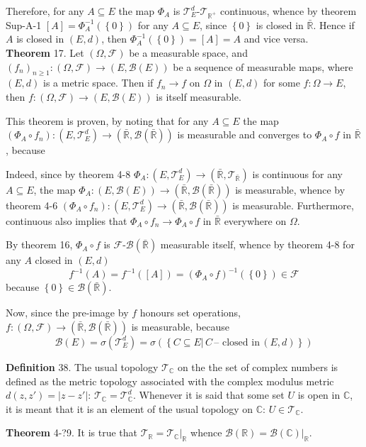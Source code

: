 \documentclass[a4paper]{article}
\newcommand{\obj}[1]{\left\{ #1 \right \}}
\newcommand{\clo}[1]{\left [ #1 \right ]}
\newcommand{\brac}[1]{\left ( #1 \right )}
\newcommand{\induc}[1]{\left . #1 \right \vert}
\newcommand{\abs}[1]{\left | #1 \right |}
\newcommand{\Rbar}{{\bar{\mathbb{R}}}}
\newcommand{\Real}{\mathbb{R}}
\newcommand{\Cplx}{\mathbb{C}}
\newcommand{\Tcal}{\mathcal{T}}
\newcommand{\Fcal}{\mathcal{F}}
\newcommand{\borel}[1]{\mathcal{B}\brac{#1}}
\begin{document}
Therefore, for any $A\subseteq E$ the map $\Phi_A$ is $\Tcal_E^d$-$\Tcal_{\Real^+}$ continuous, whence by theorem Sup-A-1 $\clo{A}=\Phi_A^{-1}\brac{\obj{0}}$ for any $A\subseteq E$, since $\obj{0}$ is closed in $\Rbar$. Hence if $A$ is closed in $\brac{E, d}$, then $\Phi_A^{-1}\brac{\obj{0}} = \clo{A} = A$ and vice versa.\\

\label{thm:metric_lim_meas} \noindent \textbf{Theorem} 17.
Let $\brac{\Omega, \Fcal}$ be a measurable space, and $\brac{f_n}_{n\geq 1}:\brac{\Omega, \Fcal}\to\brac{E, \borel{E}}$ be a sequence of measurable maps, where $\brac{E, d}$ is a metric space. Then if $f_n\to f$ on $\Omega$ in $\brac{E, d}$ for some $f:\Omega\to E$, then $f:\brac{\Omega, \Fcal}\to\brac{E, \borel{E}}$ is itself measurable.

This theorem is proven, by noting that for any $A\subseteq E$ the map $\brac{\Phi_A\circ f_n}:\brac{E, \Tcal_E^d}\to\brac{\Rbar, \borel{\Rbar}}$ is measurable and converges to $\Phi_A\circ f$ in $\Rbar$, because

Indeed, since by theorem 4-8 $\Phi_A:\brac{E, \Tcal_E^d}\to\brac{\Rbar, \Tcal_\Rbar}$ is continuous for any $A\subseteq E$, the map $\Phi_A:\brac{E, \borel{E}}\to\brac{\Rbar, \borel{\Rbar}}$ is measurable, whence by theorem 4-6 $\brac{\Phi_A\circ f_n}:\brac{E, \Tcal_E^d}\to\brac{\Rbar, \borel{\Rbar}}$ is measurable. Furthermore, continuous also implies that $\Phi_A\circ f_n\to \Phi_A\circ f$ in $\Rbar$ everywhere on $\Omega$.

By theorem 16, $\Phi_A\circ f$ is $\Fcal$-$\borel{\Rbar}$ measurable itself, whence by theorem 4-8 for any $A$ closed in $\brac{E,d}$ \[f^{-1}\brac{A} = f^{-1}\brac{\clo{A}} = \brac{\Phi_A\circ f}^{-1}\brac{\obj{0}} \in \Fcal\] because $\obj{0}\in\borel{\Rbar}$.

Now, since the pre-image by $f$ honours set operations, $f:\brac{\Omega, \Fcal}\to\brac{\Rbar, \borel{\Rbar}}$ is measurable, because \[\borel{E} = \sigma\brac{\Tcal_E^d} = \sigma\brac{\obj{ \induc{ C\subseteq E }\, C\,\text{-- closed in}\,\brac{E,d}}}\]

\noindent \textbf{Definition} 38.
The usual topology $\Tcal_\Cplx$ on the the set of complex numbers is defined as the metric topology associated with the complex modulus metric $d\brac{z, z'} = \abs{z-z'}$: $\Tcal_\Cplx = \Tcal_\Cplx^d$. Whenever it is said that some set $U$ is open in $\Cplx$, it is meant that it is an element of the usual topology on $\Cplx$: $U\in \Tcal_\Cplx$.

\label{thm:cplx_real_topology} \noindent \textbf{Theorem} 4-?9.
It is true that $\Tcal_\Real=\induc{\Tcal_\Cplx}_\Real$ whence $\borel{\Real} = \induc{\borel{\Cplx}}_\Real$.
\end{document}
